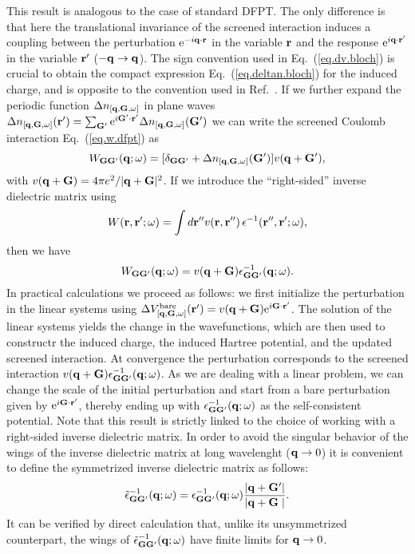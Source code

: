 \documentclass[twocolumn,prb,showpacs,superscriptaddress]{revtex4}
\def\w{\omega}
\def\q{{\bf q}}
\def\G{{\bf G}}
\def\Gp{{\bf G^\prime}}
\def\r{{\bf r}}
\def\rp{{\bf r^\prime}}
\def\rpp{{\bf r^{\prime\prime}}}
\begin{document}
This result is analogous to the case of standard DFPT. The only difference is that
here the translational invariance of the screened interaction induces a coupling
between the perturbation ${\rm e}^{-i\q\cdot\r}$ in the variable $\r$ and the response
${\rm e}^{i\q\cdot\rp}$ in the variable $\rp$ ($-\q \rightarrow \q$).
The sign convention used in Eq.\ (\ref{eq.dv.bloch}) is crucial to obtain
the compact expression Eq.\ (\ref{eq.deltan.bloch}) for the induced charge,
and is opposite to the convention used in Ref.\ .
If we further expand the periodic function $\Delta n_{[\q,\G,\w]}$ in plane
waves $\Delta n_{[\q,\G,\w]}(\rp)=\sum_\Gp {\rm e}^{i\Gp\cdot\rp} \Delta n_{[\q,\G,\w]}(\Gp)$
we can write the screened Coulomb interaction Eq.\ (\ref{eq.w.dfpt}) as
  \begin{equation}
  W_{\G\Gp}(\q;\w) = [\delta_{\G\Gp} + \Delta n_{[\q,\G,\w]}(\Gp) ]v(\q+\Gp),
  \end{equation}
with $v(\q+\G) = 4\pi e^2/|\q+\G|^2$.
If we introduce the ``right-sided'' inverse dielectric matrix using
  \begin{equation}
  W(\r,\rp;\w) = \int d\rpp v(\r,\rpp) \, \epsilon^{-1}(\rpp,\rp;\w),
  \end{equation}
then we have
  \begin{equation}\label{eq.Wg}
  W_{\G\Gp}(\q;\w) = v(\q+\G)  \epsilon^{-1}_{\G\Gp}(\q;\w).
  \end{equation}
In practical calculations we proceed as follows: we first initialize the perturbation
in the linear systems using $\Delta V^{\rm bare}_{[\q,\G,\w]}(\rp) = v(\q+\G) {\rm e}^{i\G\cdot\rp}$.
The solution of the linear systems yields the change in the wavefunctions,
which are then used to constructr the induced charge, the induced Hartree potential,
and the updated screened interaction. At convergence the perturbation corresponds to
the screened interaction $v(\q+\G) \epsilon^{-1}_{\G\Gp}(\q;\w)$.
%
As we are dealing with a linear problem, we can change the scale of the initial
perturbation and start from a bare perturbation given by ${\rm e}^{i\G\cdot\rp}$,
thereby ending up with $\epsilon^{-1}_{\G\Gp}(\q;\w)$ as the self-consistent potential.
Note that this result is strictly linked to the choice of working with a right-sided 
inverse dielectric matrix. 
%
In order to avoid the singular behavior of the wings of the inverse dielectric matrix 
at long wavelenght ($\q\rightarrow 0$) it is convenient to define the symmetrized inverse
dielectric matrix as follows:\cite{balde_tosa}
  \begin{equation}
  \tilde\epsilon^{-1}_{\G\Gp}(\q;\w) = \epsilon^{-1}_{\G\Gp}(\q;\w)  \frac{|\q+\Gp|}{|\q+\G\phantom{^\prime}|}.
  \end{equation}
It can be verified by direct calculation that, unlike its unsymmetrized counterpart,
the wings of $\tilde\epsilon^{-1}_{\G\Gp}(\q;\w)$ have finite limits for $\q\rightarrow 0$.
\end{document}
